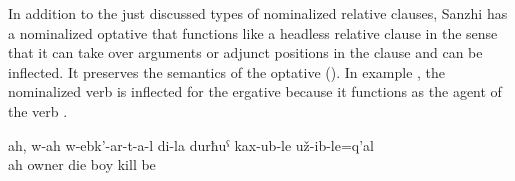 In addition to the just discussed types of nominalized relative clauses, Sanzhi has a nominalized optative that functions like a headless relative clause in the sense that it can take over arguments or adjunct positions in the clause and can be inflected. It preserves the semantics of the optative (). In example , the nominalized verb   is inflected for the ergative because it functions as the agent of the verb  .
%
\begin{exe}
	\ex	\label{ex:Ah, the ones who have one beloved (i.e. the owners), who have apparently killed my son, may they die}
	\gll	ah,	w-ah	w-ebk'-ar-t-a-l	di-la	durħuˁ	kax-ub-le	už-ib-le=q'al\\
		ah	owner	die		boy	kill	be\\
	\glt	{}
\end{exe}
